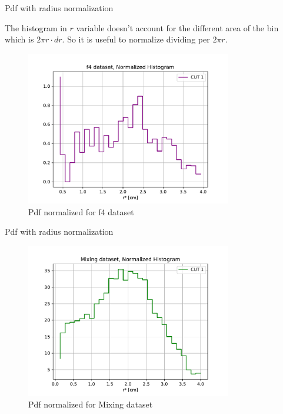 \documentclass[9pt]{beamer}
\begin{document}
\begin{frame}{Pdf with radius normalization}

The histogram in $r$ variable doesn't account for the different area of the bin which is $2 \pi r \cdot dr$. So it is useful to normalize dividing per $2 \pi r$.

\begin{figure}[hbtp]
\centering
\includegraphics[width = 0.8\textwidth]{Normalizedf4.pdf}
\caption{Pdf normalized for f4 dataset}
\end{figure}
\end{frame}

\begin{frame}{Pdf with radius normalization}

\begin{figure}[hbtp]
\centering
\includegraphics[width = 0.8\textwidth]{NormalizedMixing.pdf}
\caption{Pdf normalized for Mixing dataset}
\end{figure}
\end{frame}
\end{document}
